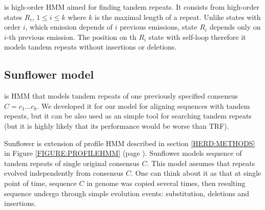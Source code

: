  is high-order HMM aimed for finding tandem repeats. It consists from
high-order states $R_i$, $1\leq i\leq k$ where $k$ is the maximal length of a
repeat. Unlike states with order $i$, which emission depends of $i$ previous
emissions, state $R_i$ depends only on $i$-th previous emission. The position
on th $R_i$ state with self-loop therefore it models tandem repeats without
insertions or deletions.


\subsection{Sunflower model}
 is HMM that models tandem repeats of one
previously specified consensus $C=c_1\dots c_k$. We developed it for our model
for aligning sequences with tandem repeats, but it can be also used as an
simple tool for searching tandem repeats (but it is highly likely that its
performance would be worse than TRF).

Sunflower is extension of profile HMM described in section \ref{HERD:METHODS}
in Figure \ref{FIGURE:PROFILEHMM} (page \pageref{FIGURE:PROFILEHMM}). Sunflower
models sequence of tandem repeats of single original consensus $C$. This model
assumes that repeats evolved independently from consensus $C$. One can think
about it as that at single point of time, sequence $C$ in genome was copied
several times, then resulting sequence undergo through simple evolution events:
substitution, deletions and insertions.

